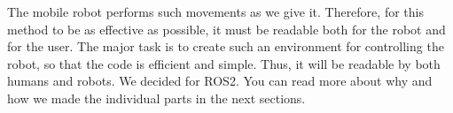 The mobile robot performs such movements as we give it. Therefore, for this method to be as effective as possible, it must be readable both
for the robot and for the user. The major task is to create such an environment for controlling the robot, so that the code is efficient and simple.
Thus, it will be readable by both humans and robots. We decided for ROS2. You can read more about why and how we made the individual parts in the next sections.

